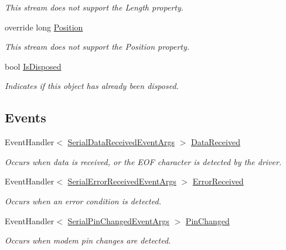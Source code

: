 \begin{DoxyCompactItemize}
\begin{DoxyCompactList}\small\item\em This stream does not support the Length property. \end{DoxyCompactList}\item 
override long \mbox{\hyperlink{class_r_j_c_p_1_1_i_o_1_1_ports_1_1_serial_port_stream_a667d098a40b33dd97b0dd1ee285bdce7}{Position}}
\begin{DoxyCompactList}\small\item\em This stream does not support the Position property. \end{DoxyCompactList}\item 
bool \mbox{\hyperlink{class_r_j_c_p_1_1_i_o_1_1_ports_1_1_serial_port_stream_a7c16250b2b3e6d7180d22544c7d5d318}{Is\+Disposed}}
\begin{DoxyCompactList}\small\item\em Indicates if this object has already been disposed. \end{DoxyCompactList}\end{DoxyCompactItemize}
\subsection*{Events}
\begin{DoxyCompactItemize}
\item 
Event\+Handler$<$ \mbox{\hyperlink{class_r_j_c_p_1_1_i_o_1_1_ports_1_1_serial_data_received_event_args}{Serial\+Data\+Received\+Event\+Args}} $>$ \mbox{\hyperlink{class_r_j_c_p_1_1_i_o_1_1_ports_1_1_serial_port_stream_a05dd2c8da5aacc2adb8653385c1bc0cd}{Data\+Received}}
\begin{DoxyCompactList}\small\item\em Occurs when data is received, or the E\+OF character is detected by the driver. \end{DoxyCompactList}\item 
Event\+Handler$<$ \mbox{\hyperlink{class_r_j_c_p_1_1_i_o_1_1_ports_1_1_serial_error_received_event_args}{Serial\+Error\+Received\+Event\+Args}} $>$ \mbox{\hyperlink{class_r_j_c_p_1_1_i_o_1_1_ports_1_1_serial_port_stream_add63e9fe00963eead46eef119dc2c934}{Error\+Received}}
\begin{DoxyCompactList}\small\item\em Occurs when an error condition is detected. \end{DoxyCompactList}\item 
Event\+Handler$<$ \mbox{\hyperlink{class_r_j_c_p_1_1_i_o_1_1_ports_1_1_serial_pin_changed_event_args}{Serial\+Pin\+Changed\+Event\+Args}} $>$ \mbox{\hyperlink{class_r_j_c_p_1_1_i_o_1_1_ports_1_1_serial_port_stream_a785d9f0596c4d08e9c71348a1b79688a}{Pin\+Changed}}
\begin{DoxyCompactList}\small\item\em Occurs when modem pin changes are detected. \end{DoxyCompactList}\end{DoxyCompactItemize}


